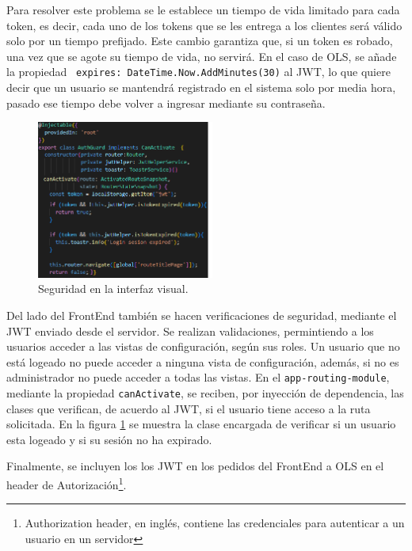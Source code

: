 Para resolver este problema se le establece un tiempo de vida limitado para cada token, es decir, cada uno de los tokens que se les entrega a los clientes ser\'a v\'alido solo por un tiempo prefijado. Este cambio garantiza que, si un token es robado, una vez que se agote su tiempo de vida, no servir\'a. En el caso de OLS, se a\~nade la propiedad \texttt{ expires: DateTime.Now.AddMinutes(30)} al JWT, lo que quiere decir que un usuario se mantendr\'a registrado en el sistema solo por media hora, pasado ese tiempo debe volver a ingresar mediante su contrase\~na.

\begin{figure}
\vspace{-20pt}
\begin{center}
\includegraphics[width=0.52\textwidth]{images/authAngular.png} 
\end{center} \vspace{-20pt} \caption{Seguridad en la interfaz visual.}  \label{auth} \vspace{-10pt} 
\end{figure}

Del lado del FrontEnd tambi\'en se hacen verificaciones de seguridad, mediante el JWT enviado desde el servidor. Se realizan validaciones, permintiendo a los usuarios acceder a las  vistas de configuraci\'on, seg\'un sus roles. Un usuario que no est\'a logeado no puede acceder a ninguna vista de configuraci\'on, adem\'as, si no es administrador no puede acceder a todas las vistas. En el \texttt{app-routing-module}, mediante la propiedad \texttt{canActivate}, se reciben, por inyecci\'on de dependencia, las clases que verifican, de acuerdo al JWT, si el usuario tiene acceso a la ruta solicitada. En la figura \ref{auth} se muestra la clase encargada de verificar si un usuario esta logeado y si su sesi\'on no ha expirado.

Finalmente, se incluyen los los JWT en los pedidos del FrontEnd a OLS en el header de Autorizaci\'on\footnote{Authorization header, en ingl\'es, contiene las credenciales para autenticar a un usuario en un servidor}.

